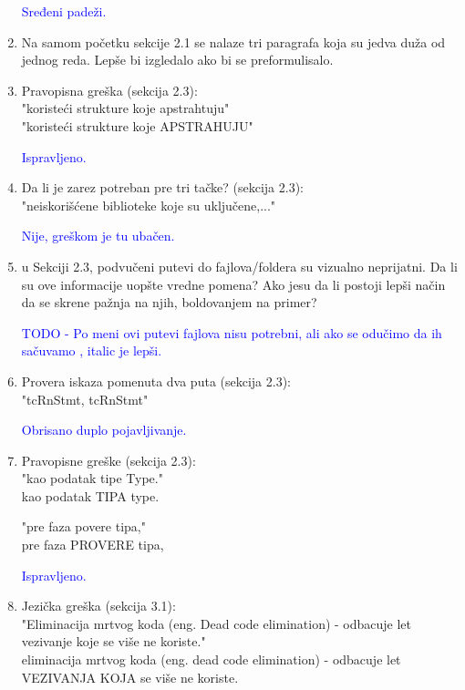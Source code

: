 \documentclass[a4paper]{report}
\newcommand{\odgovor}[1]{\textcolor{blue}{#1}}
\begin{document}
\begin{enumerate}
		\odgovor{Sređeni padeži.}
		
		
		\item Na samom početku sekcije 2.1 se nalaze tri paragrafa koja su jedva duža od jednog reda. Lepše bi izgledalo ako bi se preformulisalo.
		
		\item Pravopisna greška (sekcija 2.3):\\
		"koristeći strukture koje apstrahtuju"\\
		"koristeći strukture koje APSTRAHUJU"
		
		\odgovor{Ispravljeno.}
		
		\item Da li je zarez potreban pre tri tačke? (sekcija 2.3):\\
		"neiskorišćene biblioteke koje su uključene,..."
		
		\odgovor{Nije, greškom je tu ubačen.}
		
		\item u Sekciji 2.3, podvučeni putevi do fajlova/foldera su vizualno neprijatni. Da li su ove informacije uopšte vredne pomena? Ako jesu da li postoji lepši način da se skrene pažnja na njih, boldovanjem na primer?	
		
		\odgovor{TODO - Po meni ovi putevi fajlova nisu potrebni, ali ako se odučimo da ih sačuvamo , italic je lepši.}
		
		\item Provera iskaza pomenuta dva puta (sekcija 2.3):\\
		"tcRnStmt, tcRnStmt"
		
		\odgovor{Obrisano duplo pojavljivanje.}
		
		\item Pravopisne greške (sekcija 2.3):\\
		"kao podatak tipe Type."\\
		kao podatak TIPA type.
		
		"pre faza povere tipa,"\\
		pre faza PROVERE tipa,
		
		\odgovor{Ispravljeno.}
		
		\item Jezička greška (sekcija 3.1):\\
		"Eliminacija mrtvog koda (eng. Dead code elimination) - odbacuje
		let vezivanje koje se više ne koriste."\\
		eliminacija mrtvog koda (eng. dead code elimination) - odbacuje
		let VEZIVANJA KOJA se više ne koriste.
		

\end{enumerate}
\end{document}
